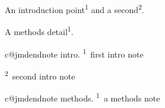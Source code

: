 An introduction point\textsuperscript{1} and a second\textsuperscript{2}.

A methods detail\textsuperscript{1}.



\bigskip
{}\par\nobreak\smallskip
\begingroup\setlength{\parindent}{0pt}
\ifcsname c@jmdendnote\endcsname\else{}\fi
\expandafter\def\csname theHjmdendnote\endcsname{intro.}
\noindent\setcounter{jmdendnote}{0}\textsuperscript{1}~first intro note\par\smallskip
\noindent\setcounter{jmdendnote}{1}\textsuperscript{2}~second intro note\par\smallskip
\endgroup



\bigskip
{}\par\nobreak\smallskip
\begingroup\setlength{\parindent}{0pt}
\ifcsname c@jmdendnote\endcsname\else{}\fi
\expandafter\def\csname theHjmdendnote\endcsname{methods.}
\noindent\setcounter{jmdendnote}{0}\textsuperscript{1}~a methods note\par\smallskip
\endgroup

